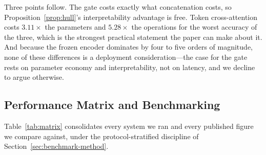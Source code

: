 \documentclass[journal,onecolumn,11pt,draftclsnofoot]{IEEEtran}   %
\begin{document}
Three points follow. The gate costs exactly what concatenation costs, so
Proposition~\ref{prop:hull}'s interpretability advantage is free. Token
cross-attention costs $3.11\times$ the parameters and $5.28\times$ the
operations for the worst accuracy of the three, which is the strongest practical
statement the paper can make about it. And because the frozen encoder dominates
by four to five orders of magnitude, none of these differences is a deployment
consideration---the case for the gate rests on parameter economy and
interpretability, not on latency, and we decline to argue otherwise.

\subsection{Performance Matrix and Benchmarking}
\label{sec:literature}
Table~\ref{tab:matrix} consolidates every system we ran and every published
figure we compare against, under the protocol-stratified discipline of
Section~\ref{sec:benchmark-method}.
\end{document}
